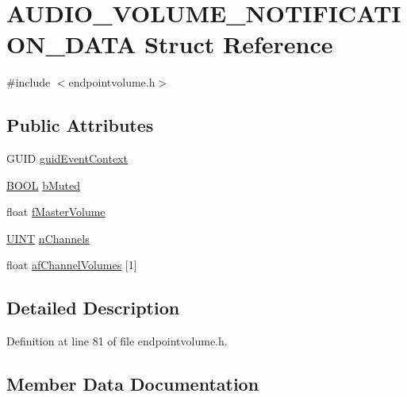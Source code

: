 \hypertarget{struct_a_u_d_i_o___v_o_l_u_m_e___n_o_t_i_f_i_c_a_t_i_o_n___d_a_t_a}{}\section{A\+U\+D\+I\+O\+\_\+\+V\+O\+L\+U\+M\+E\+\_\+\+N\+O\+T\+I\+F\+I\+C\+A\+T\+I\+O\+N\+\_\+\+D\+A\+TA Struct Reference}
\label{struct_a_u_d_i_o___v_o_l_u_m_e___n_o_t_i_f_i_c_a_t_i_o_n___d_a_t_a}


{\ttfamily \#include $<$endpointvolume.\+h$>$}

\subsection*{Public Attributes}
\begin{DoxyCompactItemize}
\item 
G\+U\+ID \hyperlink{struct_a_u_d_i_o___v_o_l_u_m_e___n_o_t_i_f_i_c_a_t_i_o_n___d_a_t_a_a6add2da9bc4c17887411d8b549b97eb4}{guid\+Event\+Context}
\item 
\hyperlink{nfilterkit_8h_a3be13892ae7076009afcf121347dd319}{B\+O\+OL} \hyperlink{struct_a_u_d_i_o___v_o_l_u_m_e___n_o_t_i_f_i_c_a_t_i_o_n___d_a_t_a_ae432d9e04d50f86f3d5a0e37d71b4e6a}{b\+Muted}
\item 
float \hyperlink{struct_a_u_d_i_o___v_o_l_u_m_e___n_o_t_i_f_i_c_a_t_i_o_n___d_a_t_a_ac5d2d81abd79dfcaa21b8695621c80d3}{f\+Master\+Volume}
\item 
\hyperlink{mapinls_8h_a36cb3b01d81ffd844bbbfb54003e06ec}{U\+I\+NT} \hyperlink{struct_a_u_d_i_o___v_o_l_u_m_e___n_o_t_i_f_i_c_a_t_i_o_n___d_a_t_a_a98284a9869793fb797df699d3f6d66ff}{n\+Channels}
\item 
float \hyperlink{struct_a_u_d_i_o___v_o_l_u_m_e___n_o_t_i_f_i_c_a_t_i_o_n___d_a_t_a_a2d1ddb99e19caa06f2057a462c6b75fc}{af\+Channel\+Volumes} \mbox{[}1\mbox{]}
\end{DoxyCompactItemize}


\subsection{Detailed Description}


Definition at line 81 of file endpointvolume.\+h.



\subsection{Member Data Documentation}
